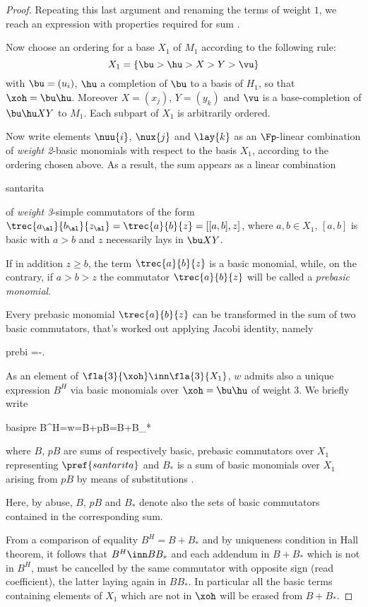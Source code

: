 \begin{proof}
Repeating this last argument and renaming the terms of weight $1$, we reach an expression with properties required for sum .

\medskip
Now choose an ordering for a base $X_1$ of $M_1$ according to the following rule:$$
X_1=\{\bu>\hu>X>Y>\vu\}
$$
with $\bu=(u_i)$, $\hu$ a completion of $\bu$ to a basis of $H_1$, so that $\xoh=\bu\hu$.
Moreover $X=(x_j)$, $Y=(y_k)$ and $\vu$ is a base-completion of $\bu\hu X Y$ to $M_1$.
Each subpart of $X_{1}$ is arbitrarily ordered.

Now write elements $\nuu{i}$, $\nux{j}$ and $\lay{k}$ as an $\Fp$-linear combination
of \emph{weight 2}-basic monomials with respect to the basis $X_1$, according to the ordering chosen above.
As a result, the sum  appears as a linear combination
\begin{labeq}{santarita}
\summ{\al}{\theta_{\al}}{[a_{\al},b_{\al},z_{\al}]}
\end{labeq}
of \emph{weight 3}-simple commutators of the form $\trec{a_{\al}}{b_{\al}}{z_{\al}}=\trec{a}{b}{z}=[[a,b],z]$,
where $a,b\in X_1$, $[a,b]$ is basic with $a>b$ and $z$ necessarily lays in $\bu X Y$.

If in addition $z\geq b$, the term $\trec{a}{b}{z}$ is a basic monomial, while, on the contrary, if $a>b>z$ the
commutator $\trec{a}{b}{z}$ will be called a \emph{prebasic monomial}.

Every prebasic monomial $\trec{a}{b}{z}$ can be transformed in the sum of two basic commutators, that's worked out applying Jacobi identity, namely
\begin{labeq}{prebi}
=-.
\end{labeq}

As an element of $\fla{3}{\xoh}\inn\fla{3}{X_1}$, $w$ admits also a unique expression $B^H$ via basic monomials over $\xoh=\bu\hu$ of
weight $3$. We briefly write
\begin{labeq}{basipre}
B^H=w=B+pB=B+B_*
\end{labeq}
where $B$, $pB$ are sums of respectively basic, prebasic commutators over $X_1$ representing $\pref{santarita}$
and $B_*$ is a sum of basic monomials over $X_{1}$ arising from $pB$ by means of substitutions .

Here, by abuse, $B$, $pB$ and $B_{*}$ denote also the sets of basic commutators contained in the
corresponding sum.

From a comparison of equality $B^{H}=B+B_{*}$ %
and by uniqueness condition in Hall theorem, it follows that 
$B^{H}\inn BB_{*}$ and
each addendum in $B+B_{*}$ which is not in $B^{H}$, must be cancelled by the same commutator with
opposite sign (read coefficient), the latter laying again in $BB_{*}$.
In particular all the basic terms containing elements
of $X_1$ which are not in $\xoh$ will be erased from $B+B_*$.


\end{proof}

